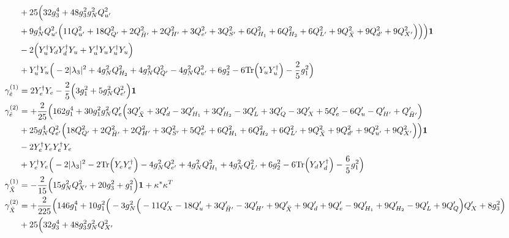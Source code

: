 {\begin{align}
 &+25 \Big(32 g_{3}^{4} +48 g_{3}^{2} g_{N}^{2} Q_{u'}^{2} \nonumber \\ 
 &+9 g_{N}^{4} Q_{u'}^{2} \Big(11 Q_{u'}^{2}  + 18 Q_{Q'}^{2}  + 2 Q_{\bar{H}'}^{2}  + 2 Q_{H'}^{2}  + 3 Q_{e'}^{2}  + 3 Q_{S'}^{2}  + 6 Q_{H_1}^{2}  + 6 Q_{H_2}^{2}  + 6 Q_{L'}^{2}  + 9 Q_{\bar{X}}^{2}  + 9 Q_{d'}^{2}  + 9 Q_{X'}^{2} \Big)\Big)\Big){\bf 1} \nonumber \\ 
 &-2 \Big({Y_{u}^{\dagger}  Y_d  Y_{d}^{\dagger}  Y_u} + {Y_{u}^{\dagger}  Y_u  Y_{u}^{\dagger}  Y_u}\Big)\nonumber \\ 
 &+{Y_{u}^{\dagger}  Y_u} \Big(-2 |\lambda_3|^2  + 4 g_{N}^{2} Q_{H_2}^{2}  + 4 g_{N}^{2} Q_{Q'}^{2}  -4 g_{N}^{2} Q_{u'}^{2}  + 6 g_{2}^{2}  -6 \mbox{Tr}\Big({Y_u  Y_{u}^{\dagger}}\Big)  -\frac{2}{5} g_{1}^{2} \Big)\\ 
\gamma_{\hat{e}}^{(1)} & =  
2 {Y_{e}^{\dagger}  Y_e}  -\frac{2}{5} \Big(3 g_{1}^{2}  + 5 g_{N}^{2} Q_{e'}^{2} \Big){\bf 1} \\ 
\gamma_{\hat{e}}^{(2)} & =  
+\frac{2}{25} \Big(162 g_{1}^{4} +30 g_{1}^{2} g_{N}^{2} Q_e' \Big(3 Q_{\bar{X}}'  + 3 Q_d'  -3 Q_{H_1}'  + 3 Q_{H_2}'  -3 Q_L'  + 3 Q_Q'  -3 Q_X'  + 5 Q_e'  -6 Q_u'  - Q_{H'}'  + Q_{\bar{H}'}'\Big)\nonumber \\ 
 &+25 g_{N}^{4} Q_{e'}^{2} \Big(18 Q_{Q'}^{2}  + 2 Q_{\bar{H}'}^{2}  + 2 Q_{H'}^{2}  + 3 Q_{S'}^{2}  + 5 Q_{e'}^{2}  + 6 Q_{H_1}^{2}  + 6 Q_{H_2}^{2}  + 6 Q_{L'}^{2}  + 9 Q_{\bar{X}}^{2}  + 9 Q_{d'}^{2}  + 9 Q_{u'}^{2}  + 9 Q_{X'}^{2} \Big)\Big){\bf 1} \nonumber \\ 
 &-2 {Y_{e}^{\dagger}  Y_e  Y_{e}^{\dagger}  Y_e} \nonumber \\ 
 &+{Y_{e}^{\dagger}  Y_e} \Big(-2 |\lambda_3|^2  -2 \mbox{Tr}\Big({Y_e  Y_{e}^{\dagger}}\Big)  -4 g_{N}^{2} Q_{e'}^{2}  + 4 g_{N}^{2} Q_{H_1}^{2}  + 4 g_{N}^{2} Q_{L'}^{2}  + 6 g_{2}^{2}  -6 \mbox{Tr}\Big({Y_d  Y_{d}^{\dagger}}\Big)  -\frac{6}{5} g_{1}^{2} \Big)\\ 
\gamma_{\hat{X}}^{(1)} & =  
-\frac{2}{15} \Big(15 g_{N}^{2} Q_{X'}^{2}  + 20 g_{3}^{2}  + g_{1}^{2}\Big){\bf 1}  + {\kappa^*  \kappa^{T}}\\ 
\gamma_{\hat{X}}^{(2)} & =  
+\frac{2}{225} \Big(146 g_{1}^{4} +10 g_{1}^{2} \Big(-3 g_{N}^{2} \Big(-11 Q_X'  -18 Q_u'  + 3 Q_{\bar{H}'}'  -3 Q_{H'}'  + 9 Q_{\bar{X}}'  + 9 Q_d'  + 9 Q_e'  -9 Q_{H_1}'  + 9 Q_{H_2}'  -9 Q_L'  + 9 Q_Q' \Big)Q_X'  + 8 g_{3}^{2} \Big)\nonumber \\ 
 &+25 \Big(32 g_{3}^{4} +48 g_{3}^{2} g_{N}^{2} Q_{X'}^{2} \nonumber \\ 

\end{align}}
